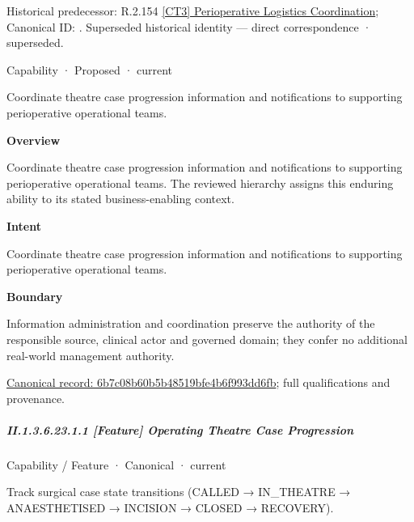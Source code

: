 {\small Historical predecessor: R.2.154 \hyperref[element:e7813a06b9df462fa135c299261f192e]{[CT3] Perioperative Logistics Coordination}; Canonical ID: \texttt{}. Superseded historical identity — direct correspondence · superseded.}\par
\label{element:6b7c08b60b5b48519bfe4b6f993dd6fb}
{\small Capability · Proposed · current}\par

Coordinate theatre case progression information and notifications to supporting perioperative operational teams.



\textbf{Overview}



Coordinate theatre case progression information and notifications to supporting perioperative operational teams. The reviewed hierarchy assigns this enduring ability to its stated business-enabling context.



\textbf{Intent}



Coordinate theatre case progression information and notifications to supporting perioperative operational teams.



\textbf{Boundary}



Information administration and coordination preserve the authority of the responsible source, clinical actor and governed domain; they confer no additional real-world management authority.


{\footnotesize \href{../../../../../../../continuum/strategy/capability/6b7c08b60b5b48519bfe4b6f993dd6fb.md}{Canonical record: 6b7c08b60b5b48519bfe4b6f993dd6fb}; full qualifications and provenance.}\par
\subparagraph*{II.1.3.6.23.1.1 [Feature] Operating Theatre Case Progression}
\label{navigation:II.1.3.6.23.1.1}

\label{element:2fd65f09f7384f0486280e56ec5a9e84}
{\small Capability / Feature · Canonical · current}\par

Track surgical case state transitions (CALLED → IN\_THEATRE → ANAESTHETISED → INCISION → CLOSED → RECOVERY).



